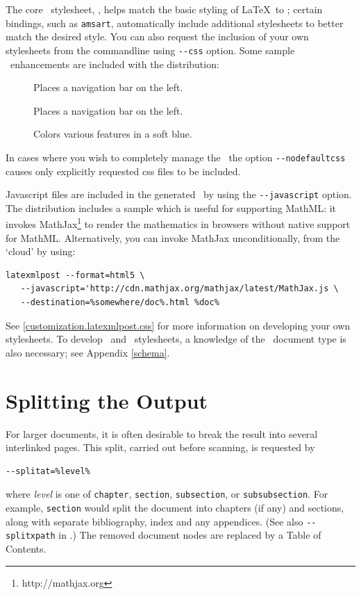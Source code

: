 \documentclass{book}
\newcommand{\shellcode}{\lstinline[style=shell]}
\begin{document}
The core \CSS\ stylesheet, , helps match the basic
styling of \LaTeX\ to \HTML; certain bindings, such as \texttt{amsart},
automatically include additional stylesheets to better match the desired style.
You can also request the inclusion of your own stylesheets from the commandline using
\shellcode{--css} option.  Some sample \CSS\ enhancements are included with the distribution:
\begin{description}
\item[] Places a navigation bar on the left.
\item[] Places a navigation bar on the left.
\item[] Colors various features in a soft blue.
\end{description}
In cases where you wish to completely manage the \CSS\,
the option \shellcode{--nodefaultcss} causes only explicitly requested css files to be included.

Javascript files are included in the generated \HTML\ by using the \shellcode{--javascript} option.
The distribution includes a sample  which is useful
for supporting MathML: it invokes MathJax\footnote{http://mathjax.org}
to render the mathematics in browsers without native support for MathML.
Alternatively, you can invoke MathJax unconditionally, from the `cloud' by using:
\begin{lstlisting}[style=shell]
latexmlpost --format=html5 \
   --javascript='http://cdn.mathjax.org/mathjax/latest/MathJax.js \
   --destination=%somewhere/doc%.html %doc%
\end{lstlisting}

See \ref{customization.latexmlpost.css} for more information on developing your own stylesheets.
To develop \CSS\ and \XSLT\ stylesheets, 
a knowledge of the \LaTeXML\ document type is also necessary; see  Appendix \ref{schema}.

\section[Splitting]{Splitting the Output}\label{usage.splitting}
For larger documents, it is often desirable to break the 
result into several interlinked pages. This split,
carried out before scanning, is requested by 
\begin{lstlisting}[style=shell]
--splitat=%level%
\end{lstlisting}
where \textit{level} is one of \texttt{chapter},
\texttt{section}, \texttt{subsection}, or \texttt{subsubsection}.
For example, \texttt{section} would split the document into
chapters (if any) and sections, along with separate
bibliography, index and any appendices.
(See also \shellcode{--splitxpath} in .)
The removed document nodes are replaced by a Table of Contents.
\end{document}
